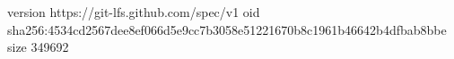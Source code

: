 version https://git-lfs.github.com/spec/v1
oid sha256:4534cd2567dee8ef066d5e9cc7b3058e51221670b8c1961b46642b4dfbab8bbe
size 349692
